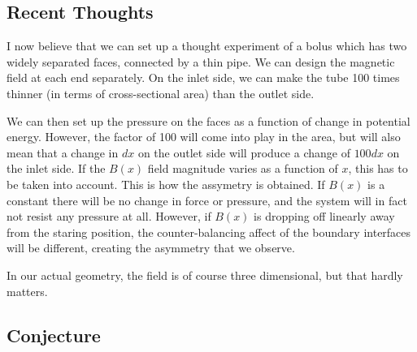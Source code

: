 \documentclass{asme2ej}
\begin{document}
\subsection{Recent Thoughts}

I now believe that we can set up a thought experiment of a bolus
which has two widely separated faces, connected by a thin pipe.
We can design the magnetic field at each end separately.
On the inlet side, we can make the tube 100 times thinner
(in terms of cross-sectional area) than the outlet side.

We can then set up the pressure on the faces as a function
of change in potential energy. However, the factor of 100 will
come into play in the area, but will also mean that a change
in $dx$ on the outlet side will produce a change of $100dx$ on
the inlet side. If the $B(x)$ field magnitude varies as a function
of $x$, this has to be taken into account. This is how the
assymetry is obtained. If $B(x)$ is a constant there will
be no change in force or pressure, and the system will in fact
not resist any pressure at all. However, if $B(x)$ is dropping
off linearly away from the staring position, the counter-balancing
affect of the boundary interfaces will be different, creating the
asymmetry that we observe.

In our actual geometry, the field is of course three dimensional,
but that hardly matters.



\subsection{Conjecture}
\end{document}
